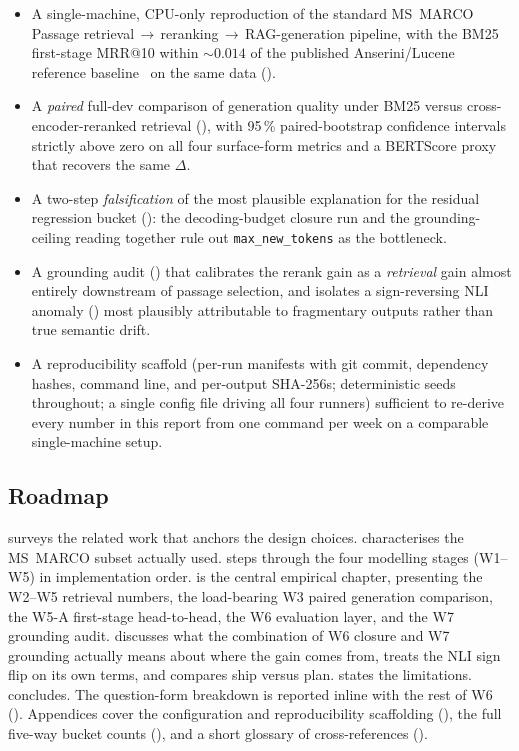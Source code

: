 \documentclass[11pt,a4paper]{article}
\newcommand{\msmarco}{MS~MARCO}
\newcommand{\bertscore}{BERTScore}
\newcommand{\bmtwofive}{BM25}
\newcommand{\barrow}{\,\allowbreak\ensuremath{\rightarrow}\allowbreak\,}
\begin{document}
\begin{itemize}
  \item A single-machine, CPU-only reproduction of the standard
        \msmarco{} Passage retrieval\barrow{}reranking\barrow{}RAG-generation
        pipeline, with the \bmtwofive{} first-stage MRR@10 within
        $\sim\!0.014$ of the published Anserini/Lucene reference
        baseline~\cite{lin2021pyserini} on the same data
        ().
  \item A \emph{paired} full-dev comparison of generation quality
        under \bmtwofive{} versus cross-encoder-reranked retrieval
        (), with 95\,\% paired-bootstrap
        confidence intervals strictly above zero on all four
        surface-form metrics and a \bertscore{} proxy that recovers
        the same $\Delta$.
  \item A two-step \emph{falsification} of the most plausible
        explanation for the residual regression bucket
        (): the decoding-budget closure run and
        the grounding-ceiling reading together rule out
        \texttt{max\_new\_tokens} as the bottleneck.
  \item A grounding audit () that calibrates the rerank
        gain as a \emph{retrieval} gain almost entirely downstream of
        passage selection, and isolates a sign-reversing NLI
        anomaly () most plausibly attributable to
        fragmentary outputs rather than true semantic drift.
  \item A reproducibility scaffold (per-run manifests with git
        commit, dependency hashes, command line, and per-output
        SHA-256s; deterministic seeds throughout; a single config
        file driving all four runners) sufficient to re-derive every
        number in this report from one command per week on a
        comparable single-machine setup.
\end{itemize}

\subsection{Roadmap}

 surveys the related work that anchors the design
choices.   characterises the \msmarco{} subset
actually used.   steps through the four modelling
stages (W1--W5) in implementation order.   is the
central empirical chapter, presenting the W2--W5 retrieval numbers,
the load-bearing W3 paired generation comparison, the W5-A
first-stage head-to-head, the W6 evaluation layer, and the W7
grounding audit.   discusses what the
combination of W6 closure and W7 grounding actually means about
where the gain comes from, treats the NLI sign flip on its own
terms, and compares ship versus plan.   states
the limitations.   concludes.
The question-form breakdown is reported inline with the rest of W6
().  Appendices cover the configuration and
reproducibility scaffolding (), the full
five-way bucket counts (), and a
short glossary of cross-references ().
\end{document}

